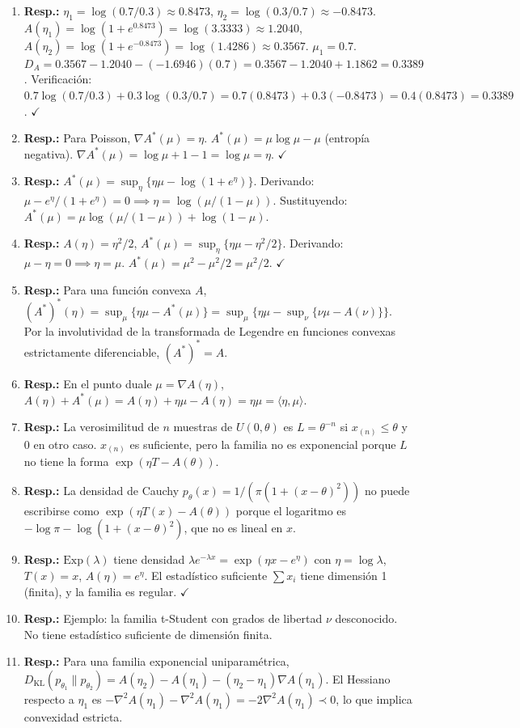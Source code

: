 \begin{enumerate}
	\item \textbf{Resp.:} $\eta_1 = \log(0.7/0.3) \approx 0.8473$, $\eta_2 = \log(0.3/0.7) \approx -0.8473$.  $A(\eta_1) = \log(1+e^{0.8473}) = \log(3.3333) \approx 1.2040$, $A(\eta_2) = \log(1+e^{-0.8473}) = \log(1.4286) \approx 0.3567$.  $\mu_1 = 0.7$.  $D_A = 0.3567 - 1.2040 - (-1.6946)(0.7) = 0.3567 - 1.2040 + 1.1862 = 0.3389$.  Verificación: $0.7\log(0.7/0.3) + 0.3\log(0.3/0.7) = 0.7(0.8473) + 0.3(-0.8473) = 0.4(0.8473) = 0.3389$.  $\checkmark$
	\item \textbf{Resp.:} Para Poisson, $\nabla A^*(\mu) = \eta$.  $A^*(\mu) = \mu\log\mu - \mu$ (entropía negativa).  $\nabla A^*(\mu) = \log\mu + 1 - 1 = \log\mu = \eta$.  $\checkmark$
	\item \textbf{Resp.:} $A^*(\mu) = \sup_\eta\{\eta\mu - \log(1+e^\eta)\}$.  Derivando: $\mu - e^\eta/(1+e^\eta) = 0 \implies \eta = \log(\mu/(1-\mu))$.  Sustituyendo: $A^*(\mu) = \mu\log(\mu/(1-\mu)) + \log(1-\mu)$.
	\item \textbf{Resp.:} $A(\eta) = \eta^2/2$, $A^*(\mu) = \sup_\eta\{\eta\mu - \eta^2/2\}$.  Derivando: $\mu - \eta = 0 \implies \eta = \mu$.  $A^*(\mu) = \mu^2 - \mu^2/2 = \mu^2/2$.  $\checkmark$
	\item \textbf{Resp.:} Para una función convexa $A$, $(A^*)^*(\eta) = \sup_\mu\{\eta\mu - A^*(\mu)\} = \sup_\mu\{\eta\mu - \sup_\nu\{\nu\mu - A(\nu)\}\}$.  Por la involutividad de la transformada de Legendre en funciones convexas estrictamente diferenciable, $(A^*)^* = A$.
	\item \textbf{Resp.:} En el punto duale $\mu = \nabla A(\eta)$, $A(\eta) + A^*(\mu) = A(\eta) + \eta\mu - A(\eta) = \eta\mu = \langle \eta, \mu \rangle$.
	\item \textbf{Resp.:} La verosimilitud de $n$ muestras de $U(0, \theta)$ es $L = \theta^{-n}$ si $x_{(n)} \le \theta$ y 0 en otro caso.  $x_{(n)}$ es suficiente, pero la familia no es exponencial porque $L$ no tiene la forma $\exp(\eta T - A(\theta))$.
	\item \textbf{Resp.:} La densidad de Cauchy $p_\theta(x) = 1/(\pi(1+(x-\theta)^2))$ no puede escribirse como $\exp(\eta T(x) - A(\theta))$ porque el logaritmo es $-\log\pi - \log(1+(x-\theta)^2)$, que no es lineal en $x$.
	\item \textbf{Resp.:} $\mathrm{Exp}(\lambda)$ tiene densidad $\lambda e^{-\lambda x} = \exp(\eta x - e^\eta)$ con $\eta = \log\lambda$, $T(x) = x$, $A(\eta) = e^\eta$.  El estadístico suficiente $\sum x_i$ tiene dimensión 1 (finita), y la familia es regular.  $\checkmark$
	\item \textbf{Resp.:} Ejemplo: la familia t-Student con grados de libertad $\nu$ desconocido.  No tiene estadístico suficiente de dimensión finita.
	\item \textbf{Resp.:} Para una familia exponencial uniparamétrica, $D_{\mathrm{KL}}(p_{\theta_1} \| p_{\theta_2}) = A(\eta_2) - A(\eta_1) - (\eta_2 - \eta_1)\nabla A(\eta_1)$.  El Hessiano respecto a $\eta_1$ es $-\nabla^2 A(\eta_1) - \nabla^2 A(\eta_1) = -2\nabla^2 A(\eta_1) \prec 0$, lo que implica convexidad estricta.
\end{enumerate}

